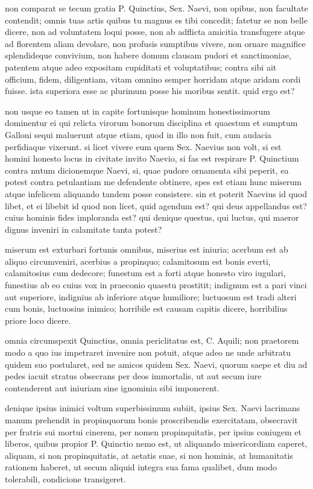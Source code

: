  non comparat se tecum gratia P. Quinctius, Sex. Naevi, non opibus, non facultate contendit; omnis tuas artis quibus tu magnus es tibi concedit; fatetur se non belle dicere, non ad voluntatem loqui posse, non ab adflicta amicitia transfugere atque ad florentem aliam devolare, non profusis sumptibus vivere, non ornare magnifice splendideque convivium, non habere domum clausam pudori et sanctimoniae, patentem atque adeo expositam cupiditati et voluptatibus; contra sibi ait officium, fidem, diligentiam, vitam omnino semper horridam atque aridam cordi fuisse. ista superiora esse ac plurimum posse his moribus sentit. quid ergo est?

 non usque eo tamen ut in capite fortunisque hominum honestissimorum dominentur ei qui relicta virorum bonorum disciplina et quaestum et sumptum Galloni sequi maluerunt atque etiam, quod in illo non fuit, cum audacia perfidiaque vixerunt. si licet vivere eum quem Sex. Naevius non volt, si est homini honesto locus in civitate invito Naevio, si fas est respirare P. Quinctium contra nutum dicionemque Naevi, si, quae pudore ornamenta sibi peperit, ea potest contra petulantiam me defendente obtinere, spes est etiam hunc miserum atque infelicem aliquando tandem posse consistere. sin et poterit Naevius id quod libet, et ei libebit id quod non licet, quid agendum est? qui deus appellandus est? cuius hominis fides imploranda est? qui denique questus, qui luctus, qui maeror dignus inveniri in calamitate tanta potest?

 miserum est exturbari fortunis omnibus, miserius est iniuria; acerbum est ab aliquo circumveniri, acerbius a propinquo; calamitosum est bonis everti, calamitosius cum dedecore; funestum est a forti atque honesto viro iugulari, funestius ab eo cuius vox in praeconio quaestu prostitit; indignum est a pari vinci aut superiore, indignius ab inferiore atque humiliore; luctuosum est tradi alteri cum bonis, luctuosius inimico; horribile est causam capitis dicere, horribilius priore loco dicere.

 omnia circumspexit Quinctius, omnia periclitatus est, C. Aquili; non praetorem modo a quo ius impetraret invenire non potuit, atque adeo ne unde arbitratu quidem suo postularet, sed ne amicos quidem Sex. Naevi, quorum saepe et diu ad pedes iacuit stratus obsecrans per deos immortalis, ut aut secum iure contenderent aut iniuriam sine ignominia sibi imponerent.

 denique ipsius inimici voltum superbissimum subiit, ipsius Sex. Naevi lacrimans manum prehendit in propinquorum bonis proscribendis exercitatam, obsecravit per fratris sui mortui cinerem, per nomen propinquitatis, per ipsius coniugem et liberos, quibus propior P. Quinctio nemo est, ut aliquando misericordiam caperet, aliquam, si non propinquitatis, at aetatis suae, si non hominis, at humanitatis rationem haberet, ut secum aliquid integra sua fama qualibet, dum modo tolerabili, condicione transigeret.

